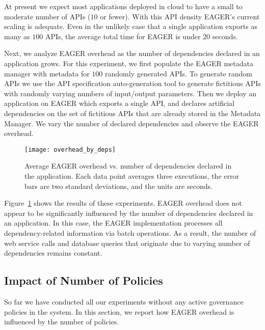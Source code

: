 At present we expect most applications deployed in cloud to have a small to 
moderate number of APIs ($10$ or fewer).  With this API density EAGER's current 
scaling is adequate.  Even in the
unlikely case that a single application exports as many as $100$ APIs,
the average total time for EAGER is under $20$ seconds.

Next, we analyze EAGER overhead as the number of dependencies declared in
an application grows. For this experiment, we first populate the EAGER
metadata manager with metadata for $100$ randomly 
generated APIs. To generate random APIs we use the API specification
auto-generation tool to generate
fictitious APIs with randomly varying numbers of input/output parameters.
Then we
deploy an application on EAGER which exports a single API, and declares
artificial dependencies on the set of fictitious 
APIs that are already stored in the Metadata Manager. We
vary the number of declared dependencies and observe the EAGER overhead.

\begin{figure}
\centering
\texttt{[image: overhead\_by\_deps]}
\caption{Average EAGER overhead vs. number of dependencies declared in the
application.  Each data point averages three executions, the error bars are
two standard deviations, and the units are seconds.}
\label{fig:overhead_by_deps}
\vspace{-0.2in}
\end{figure}

Figure~\ref{fig:overhead_by_deps} shows the results of these experiments. 
EAGER overhead does not appear to be significantly
influenced by the number of dependencies declared in an application. 
In this case, the EAGER implementation processes
all dependency-related information via batch operations. 
As a result, the number of web service calls and database queries that originate 
due to varying number of dependencies remains constant. 

\subsection{Impact of Number of Policies}

So far we have conducted all our experiments without any active governance 
policies in the system. In this section, we report how EAGER overhead
is influenced by the number of policies.

